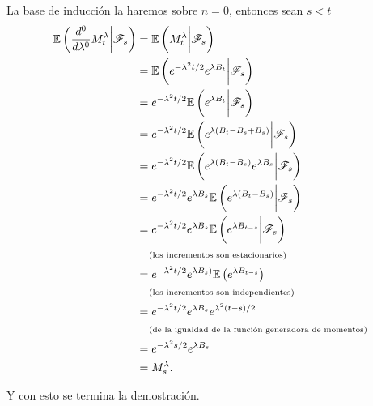 La base de inducción la haremos sobre $n = 0$, entonces sean $s < t$
\begin{align}
        \mathbb{E}\left(\frac{d^0}{d \lambda^0} M_t^\lambda \bigg| \mathscr{F}_s \right)  &=  \mathbb{E}\left( M_t^\lambda \bigg| \mathscr{F}_s \right)                                               \\
                                                                    &=  \mathbb{E}\left( e^{-\lambda^2t/2} e^{\lambda B_t} \bigg| \mathscr{F}_s \right)                              \\
                                                                    &=  e^{-\lambda^2 t/2} \mathbb{E}\left( e^{\lambda B_t} \bigg| \mathscr{F}_s \right)                             \\
                                                                    &=  e^{-\lambda^2 t/2} \mathbb{E}\left( e^{\lambda (B_t - B_s + B_s)} \bigg| \mathscr{F}_s \right)               \\
                                                                    &=  e^{-\lambda^2 t/2} \mathbb{E}\left( e^{\lambda (B_t - B_s)} e^{\lambda B_s} \bigg| \mathscr{F}_s \right)     \\
                                                                    &=  e^{-\lambda^2 t/2} e^{\lambda B_s} \mathbb{E}\left( e^{\lambda (B_t - B_s)}  \bigg| \mathscr{F}_s \right)    \\
                                                                    &=  e^{-\lambda^2 t/2} e^{\lambda B_s} \mathbb{E}\left( e^{\lambda B_{t-s}}  \bigg| \mathscr{F}_s \right)        \\
                                                                    &\;\;\;\;\mbox{{\scriptsize(los incrementos son estacionarios)}}                                                    \\
                                                                    &=  e^{-\lambda^2 t/2} e^{\lambda B_s)} \mathbb{E}\left( e^{\lambda B_{t-s}} \right)                    \\
                                                                    &\;\;\;\;\mbox{{\scriptsize(los incrementos son independientes)}}                                                   \\
                                                                    &=  e^{-\lambda^2 t/2} e^{\lambda B_s} e^{\lambda^2 (t-s)/2}                                    \\
                                                                    &\;\;\;\;\mbox{{\scriptsize(de la igualdad de la función generadora de momentos)}}                                  \\
                                                                    &=  e^{-\lambda^2 s/2} e^{\lambda B_s}                                                          \\
                                                                    &=  M_s^\lambda.
\end{align}\pn

Y con esto se termina la demostración.
 

